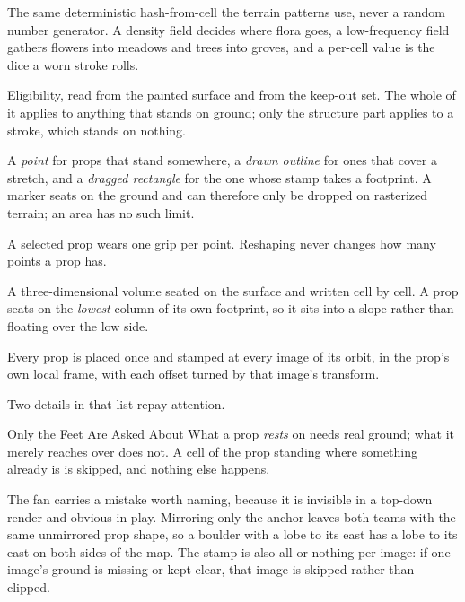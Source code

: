 \begin{description}[leftmargin=1.6em,style=nextline,itemsep=5pt]
  \item[Noise] The same deterministic hash-from-cell the terrain patterns use, never
    a random number generator. A density field decides where flora goes, a
    low-frequency field gathers flowers into meadows and trees into groves, and a
    per-cell value is the dice a worn stroke rolls.
  \item[Mask] Eligibility, read from the painted surface and from the keep-out set.
    The whole of it applies to anything that stands on ground; only the structure
    part applies to a stroke, which stands on nothing.
  \item[Placement] A \emph{point} for props that stand somewhere, a \emph{drawn
    outline} for ones that cover a stretch, and a \emph{dragged rectangle} for the
    one whose stamp takes a footprint. A marker seats on the ground and can
    therefore only be dropped on rasterized terrain; an area has no such limit.
  \item[Reshaping] A selected prop wears one grip per point. Reshaping never changes
    how many points a prop has.
  \item[Stamp] A three-dimensional volume seated on the surface and written cell by
    cell. A prop seats on the \emph{lowest} column of its own footprint, so it sits
    into a slope rather than floating over the low side.
  \item[The fan] Every prop is placed once and stamped at every image of its orbit,
    in the prop's own local frame, with each offset turned by that image's
    transform.
\end{description}

Two details in that list repay attention.

\begin{ruling}{Only the Feet Are Asked About}
What a prop \emph{rests} on needs real ground; what it merely reaches over does
not. A cell of the prop standing where something already is is skipped, and nothing
else happens.
\end{ruling}

The fan carries a mistake worth naming, because it is invisible in a top-down
render and obvious in play. Mirroring only the anchor leaves both teams with the
same unmirrored prop shape, so a boulder with a lobe to its east has a lobe to its
east on both sides of the map. The stamp is also all-or-nothing per image: if one
image's ground is missing or kept clear, that image is skipped rather than clipped.

